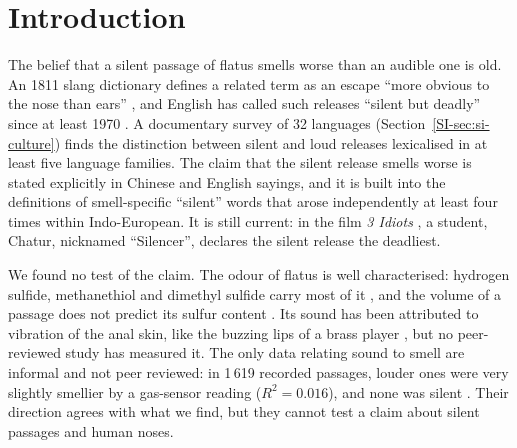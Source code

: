 \section{Introduction}
\label{sec:intro}

The belief that a silent passage of flatus smells worse than an audible one is old. An 1811 slang dictionary
defines a related term as an escape ``more obvious to the nose than ears'' \cite{grose1811}, and English has called
such releases ``silent but deadly'' since at least 1970 \cite{green2026}. A documentary survey of 32 languages
(Section~\ref{SI-sec:si-culture}) finds the distinction between silent and loud releases lexicalised in at least five
language families. The claim that the silent release smells worse is stated explicitly in Chinese and English sayings,
and it is built into the definitions of smell-specific ``silent'' words that arose independently at least four times
within Indo-European.
It is still current: in the film \emph{3 Idiots} \cite{hirani2009}, a student, Chatur, nicknamed ``Silencer'',
declares the silent release the deadliest.

We found no test of the claim. The odour of flatus is well characterised: hydrogen sulfide, methanethiol and
dimethyl sulfide carry most of it \cite{suarez1998,tangerman2009}, and the volume of a passage does not predict its sulfur
content \cite{suarez1997}. Its sound has been attributed to vibration of the anal skin, like the buzzing lips of a
brass player \cite{ancalle2021}, but no peer-reviewed study has measured it. The only data relating sound to smell
are informal and not peer reviewed: in 1\,619 recorded passages, louder ones were very slightly smellier by a gas-sensor
reading ($R^2 = 0.016$), and none was silent \cite{snyder2020}. Their direction agrees with what we find, but they
cannot test a claim about silent passages and human noses.


